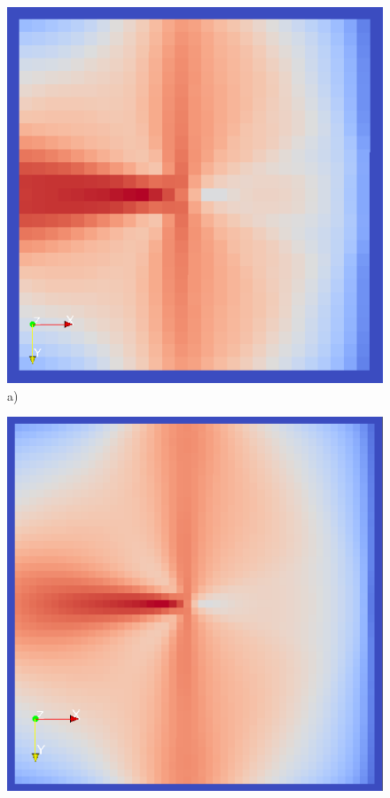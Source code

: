 \documentclass{scrartcl}
\begin{document}
\begin{figure}[!t]
\centering
  \begin{minipage}{0.3\textwidth}
  \centering
  \includegraphics[height=\textwidth]{img/inverse29.png}\label{1a}
    a)
    \label{a)}
  \end{minipage}
  \begin{minipage}{0.3\textwidth}
  \centering
    \includegraphics[height=\textwidth]{img/inverse51.PNG}\label{2a}

\end{minipage}
\end{figure}
\end{document}
